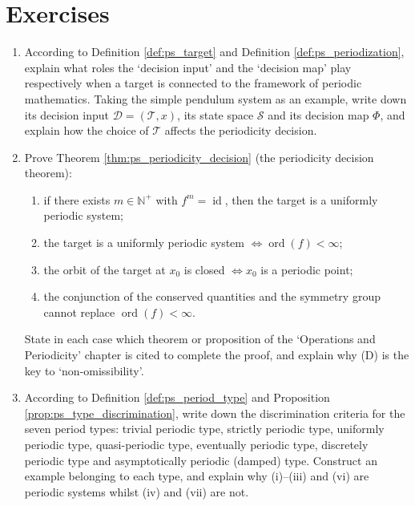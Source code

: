 \section*{Exercises}

\begin{enumerate}[leftmargin=3em, label=\textbf{Exercise \arabic*}]
    \item According to Definition \ref{def:ps_target} and Definition \ref{def:ps_periodization},
    explain what roles the `decision input' and the `decision map' play respectively
    when a target is connected to the framework of periodic mathematics.
    Taking the simple pendulum system as an example, write down its decision input $\mathcal{D}=(\mathcal{T},x)$,
    its state space $\mathcal{S}$ and its decision map $\Phi$,
    and explain how the choice of $\mathcal{T}$ affects the periodicity decision.

    \item Prove Theorem \ref{thm:ps_periodicity_decision} (the periodicity decision theorem):
    \begin{enumerate}[label=(\Alph*)]
        \item if there exists $m\in\mathbb{N}^+$ with $f^m=\operatorname{id}$,
              then the target is a uniformly periodic system;
        \item the target is a uniformly periodic system $\iff\operatorname{ord}(f)<\infty$;
        \item the orbit of the target at $x_0$ is closed $\iff x_0$ is a periodic point;
        \item the conjunction of the conserved quantities and the symmetry group cannot replace $\operatorname{ord}(f)<\infty$.
    \end{enumerate}
    State in each case which theorem or proposition of the `Operations and Periodicity' chapter
    is cited to complete the proof,
    and explain why (D) is the key to `non-omissibility'.

    \item According to Definition \ref{def:ps_period_type} and Proposition \ref{prop:ps_type_discrimination},
    write down the discrimination criteria for the seven period types:
    trivial periodic type, strictly periodic type, uniformly periodic type, quasi-periodic type,
    eventually periodic type, discretely periodic type and asymptotically periodic (damped) type.
    Construct an example belonging to each type,
    and explain why (i)--(iii) and (vi) are periodic systems whilst (iv) and (vii) are not.


\end{enumerate}
